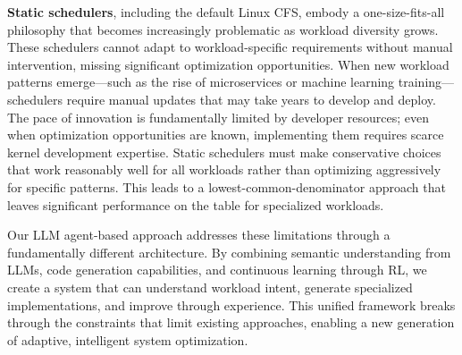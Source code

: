 \textbf{Static schedulers}, including the default Linux CFS, embody a one-size-fits-all philosophy that becomes increasingly problematic as workload diversity grows. These schedulers cannot adapt to workload-specific requirements without manual intervention, missing significant optimization opportunities. When new workload patterns emerge—such as the rise of microservices or machine learning training—schedulers require manual updates that may take years to develop and deploy. The pace of innovation is fundamentally limited by developer resources; even when optimization opportunities are known, implementing them requires scarce kernel development expertise. Static schedulers must make conservative choices that work reasonably well for all workloads rather than optimizing aggressively for specific patterns. This leads to a lowest-common-denominator approach that leaves significant performance on the table for specialized workloads.

Our LLM agent-based approach addresses these limitations through a fundamentally different architecture. By combining semantic understanding from LLMs, code generation capabilities, and continuous learning through RL, we create a system that can understand workload intent, generate specialized implementations, and improve through experience. This unified framework breaks through the constraints that limit existing approaches, enabling a new generation of adaptive, intelligent system optimization.